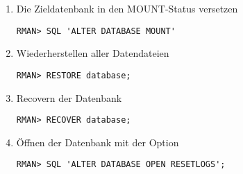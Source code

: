 \begin{enumerate}
\begin{merke}
              \end{merke}
            \item Die Zieldatenbank in den MOUNT-Status versetzen
              \begin{lstlisting}[caption={Zieldatenbank
              mounten},label=admin1520,language=rman,emph={[9]ALTER,DATABASE,MOUNT},emphstyle={[9]\color{magenta}\bfseries}]
RMAN> SQL 'ALTER DATABASE MOUNT'
              \end{lstlisting}
\clearpage
            \item Wiederherstellen aller Datendateien
              \begin{lstlisting}[caption={Datendateien wiederherstellen},label=admin1521,language=rman]
RMAN> RESTORE database;
              \end{lstlisting}
            \item Recovern der Datenbank
              \begin{lstlisting}[caption={Recovern der Datenbank},label=admin1522,language=rman]
RMAN> RECOVER database;
              \end{lstlisting}
            \item \"Offnen der Datenbank mit der Option 
              \begin{lstlisting}[caption={Datenbank mit open resetlogs \"offnen},label=admin1523,language=rman,emph={[9]ALTER,DATABASE,OPEN,RESETLOGS},emphstyle={[9]\color{magenta}\bfseries}]
RMAN> SQL 'ALTER DATABASE OPEN RESETLOGS';
              \end{lstlisting}
            \end{enumerate}
